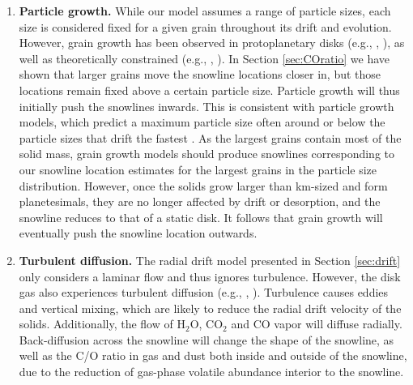 \documentclass[apj]{emulateapj}
\begin{document}
\begin{enumerate}
\item \textbf{Particle growth.} While our model assumes a range of particle sizes, each size is considered fixed for a given grain throughout its drift and evolution. However, grain growth has been observed in protoplanetary disks (e.g., \citealt{ricci10}, \citealt{perez12}), as well as theoretically constrained (e.g., \citealt{birnstiel10}, \citealt{birnstiel12}). In Section \ref{sec:COratio} we have shown that larger grains move the snowline locations closer in, but those locations remain fixed above a certain particle size. Particle growth will thus initially push the snowlines inwards. This is consistent with particle growth models, which predict a maximum particle size often around or below the particle sizes that drift the fastest \citep{birnstiel12}. As the largest grains contain most of the solid mass, grain growth models should produce snowlines corresponding to our snowline location estimates for the largest grains in the particle size distribution. However, once the solids grow larger than km-sized and form planetesimals, they are no longer affected by drift or desorption, and the snowline reduces to that of a static disk. It follows that grain growth will eventually push the snowline location outwards.

\item \textbf{Turbulent diffusion.} The radial drift model presented in Section \ref{sec:drift} only considers a laminar flow and thus ignores turbulence. However, the disk gas also experiences turbulent diffusion (e.g., \citealt{birnstiel12}, \citealt{alidib14}). Turbulence causes eddies and vertical mixing, which are likely to reduce the radial drift velocity of the solids. Additionally, the flow of H$_2$O, CO$_2$ and CO vapor will diffuse radially. Back-diffusion across the snowline will change the shape of the snowline, as well as the C/O ratio in gas and dust both inside and outside of the snowline, due to the reduction of gas-phase volatile abundance interior to the snowline. 


\end{enumerate}
\end{document}
